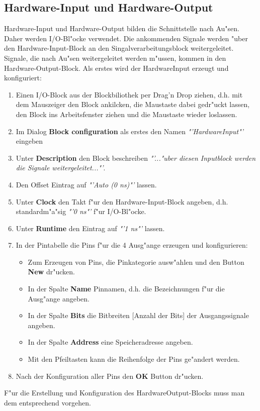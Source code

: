 \subsection{Hardware-Input und Hardware-Output}
Hardware-Input und Hardware-Output bilden die Schnittstelle nach Au"sen. Daher werden I/O-Bl"ocke verwendet. Die ankommenden Signale werden "uber den Hardware-Input-Block an den Singalverarbeitungsblock weitergeleitet. Signale, die nach Au"sen weitergeleitet werden m"ussen, kommen in den Hardware-Output-Block. Als erstes wird der HardwareInput erzeugt und konfiguriert:
\begin{enumerate}
	\item Einen I/O-Block aus der Blockbiliothek per Drag'n Drop ziehen, d.h. mit dem Mauszeiger den Block ankilcken, die Maustaste dabei gedr"uckt lassen, den Block ins Arbeitsfenster ziehen und die Maustaste wieder loslassen.
	\item Im Dialog {\bf Block configuration} als erstes den Namen {\itshape "'HardwareInput"'} eingeben
	\item Unter {\bf Description} den Block beschreiben {\itshape "'..."uber diesen Inputblock werden die Signale weitergeleitet..."'}.
	\item Den Offset Eintrag auf {\itshape "'Auto (0 ns)"'} lassen.
	\item Unter {\bf Clock} den Takt f"ur den Hardware-Input-Block angeben, d.h. standardm"a"sig {\itshape "'0 ns"'} f"ur I/O-Bl"ocke.
	\item Unter {\bf Runtime} den Eintrag auf {\itshape "'1 ns"'} lassen.
	\item In der Pintabelle die Pins f"ur die 4 Ausg"ange erzeugen und konfigurieren:
		\begin{itemize}
			\item Zum Erzeugen von Pins, die Pinkategorie ausw"ahlen und den Button {\bf New} dr"ucken.
			\item In der Spalte {\bf Name} Pinnamen, d.h. die Bezeichnungen f"ur die Ausg"ange angeben.
			\item In der Spalte {\bf Bits} die Bitbreiten [Anzahl der Bits] der Ausgangssignale angeben.
			\item In der Spalte {\bf Address} eine Speicheradresse angeben.
			\item Mit den Pfeiltasten kann die Reihenfolge der Pins ge"andert werden.
		\end{itemize}
	\item Nach der Konfiguration aller Pins den {\bf OK} Button dr"ucken.
\end{enumerate}
F"ur die Erstellung und Konfiguration des HardwareOutput-Blocks muss man dem entsprechend vorgehen.

